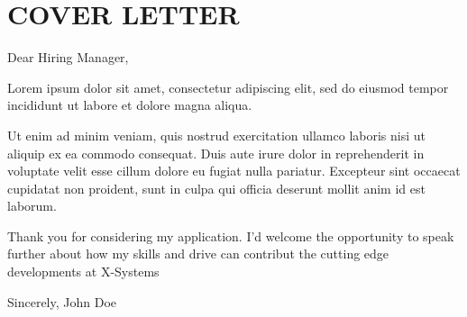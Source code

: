 \section{COVER LETTER}
\setlength{\parskip}{1em}
Dear Hiring Manager,
\par
Lorem ipsum dolor sit amet, consectetur adipiscing elit, sed do eiusmod tempor incididunt ut labore et dolore magna aliqua.
\par
Ut enim ad minim veniam, quis nostrud exercitation ullamco laboris nisi ut aliquip ex ea commodo consequat. Duis aute irure dolor in reprehenderit in voluptate velit esse cillum dolore eu fugiat nulla pariatur. Excepteur sint occaecat cupidatat non proident, sunt in culpa qui officia deserunt mollit anim id est laborum.
\par
Thank you for considering my application. I’d welcome the opportunity to speak further about how my skills and drive can contribut the cutting edge developments at X-Systems
\par
Sincerely,
John Doe